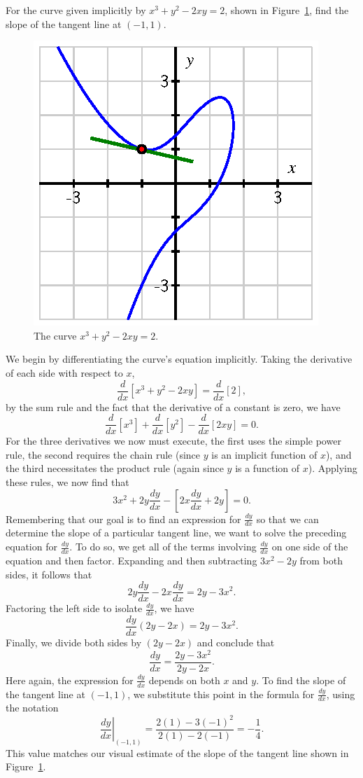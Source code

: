 \bex \label{Ex:2.7.1}
For the curve given implicitly by $x^3 + y^2 - 2xy = 2$, shown in Figure~\ref{F:2.7.Ex1}, find the slope of the tangent line at $(-1,1)$.
\begin{figure}[h]
\begin{center}
\includegraphics{figures/2_7_Ex1.eps}
\caption{The curve $x^3 + y^2 - 2xy = 2$.} \label{F:2.7.Ex1}
\end{center}
\end{figure}
\eex
We begin by differentiating the curve's equation implicitly.  Taking the derivative of each side with respect to $x$,
$$\frac{d}{dx}\left[ x^3 + y^2 - 2xy \right] = \frac{d}{dx} \left[ 2 \right],$$
by the sum rule and the fact that the derivative of a constant is zero, we have
$$\frac{d}{dx}[x^3] + \frac{d}{dx}[y^2] - \frac{d}{dx}[2xy] = 0.$$
For the three derivatives we now must execute, the first uses the simple power rule, the second requires the chain rule (since $y$ is an implicit function of $x$), and the third necessitates the product rule (again since $y$ is a function of $x$).  Applying these rules, we now find that
$$3x^2 + 2y\frac{dy}{dx} - [2x \frac{dy}{dx} + 2y] = 0.$$
Remembering that our goal is to find an expression for $\frac{dy}{dx}$ so that we can determine the slope of a particular tangent line, we want to solve the preceding equation for $\frac{dy}{dx}$.  To do so, we get all of the terms involving $\frac{dy}{dx}$ on one side of the equation and then factor.  Expanding and then subtracting $3x^2 - 2y$ from both sides, it follows that
$$2y\frac{dy}{dx} - 2x \frac{dy}{dx}= 2y - 3x^2.$$
Factoring the left side to isolate $\frac{dy}{dx}$, we have
$$\frac{dy}{dx}(2y - 2x) = 2y - 3x^2.$$
Finally, we divide both sides by $(2y - 2x)$ and conclude that
$$\frac{dy}{dx} = \frac{2y-3x^2}{2y-2x}.$$
Here again, the expression for $\frac{dy}{dx}$ depends on both $x$ and $y$.  To find the slope of the tangent line at $(-1,1)$, we substitute this point in the formula for $\frac{dy}{dx}$, using the notation
$$ \left. \frac{dy}{dx} \right|_{(-1,1)} = \frac{2(1)-3(-1)^2}{2(1)-2(-1)} = -\frac14.$$
This value matches our visual estimate of the slope of the tangent line shown in Figure~\ref{F:2.7.Ex1}.

